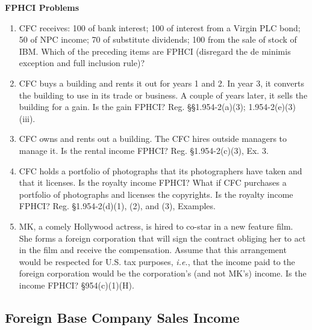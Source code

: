 	\begin{center}
		\textbf{FPHCI Problems}
	\end{center}
	\begin{select}
	
			\begin{enumerate}

				\item CFC receives: 100 of bank interest; 100 of interest from a Virgin PLC bond; 50 of NPC income; 70 of substitute dividends; 100 from the sale of stock of IBM.  Which of the preceding items are FPHCI (disregard the de minimis exception and full inclusion rule)?

				\item CFC buys a building and rents it out for years 1 and 2.  In year 3, it converts the building to use in its trade or business.  A couple of years later, it sells the building for a gain.  Is the gain FPHCI?  Reg. \S\S 1.954-2(a)(3); 1.954-2(e)(3)(iii).

				\item CFC owns and rents out a building. The CFC hires outside managers to manage it.  Is the rental income FPHCI?  Reg. \S 1.954-2(c)(3), Ex. 3.

				\item CFC holds a portfolio of photographs that its photographers have taken and that it licenses.  Is the royalty income FPHCI?  What if CFC purchases a portfolio of photographs and licenses the copyrights.  Is the royalty income FPHCI?  Reg. \S 1.954-2(d)(1), (2), and (3), Examples.
				
				\item MK, a comely Hollywood actress, is hired to co-star in a new feature film.  She forms a foreign corporation that will sign the contract obliging her to act in the film and receive the compensation.  Assume that this arrangement would be respected for U.S. tax purposes, \emph{i.e.}, that the income paid to the foreign corporation would be the corporation's (and not MK's) income.  Is the income FPHCI?  \S954(c)(1)(H).

			\end{enumerate}
	\end{select}
	


	
	\subsection{Foreign Base Company Sales Income}
	\\
		
